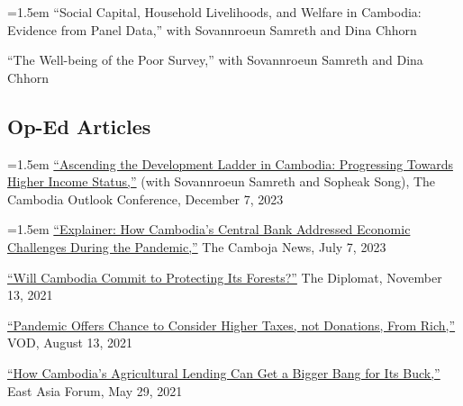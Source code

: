 \documentclass[10pt,a4paper]{article}
\begin{document}
	\hangindent=1.5em
	``Social Capital, Household Livelihoods, and Welfare in Cambodia: Evidence from Panel Data,'' with Sovannroeun Samreth and Dina Chhorn\\ \vspace{-.5em}
	
	``The Well-being of the Poor Survey,'' with Sovannroeun Samreth and Dina Chhorn

\subsection*{Op-Ed Articles}

	\hangindent=1.5em
	\href{https://coc2023.cdri.org.kh/ascending-the-development-ladder-in-cambodia-progressing-towards-higher-income-status/}{``Ascending the Development Ladder in Cambodia: Progressing Towards Higher Income Status,''} (with Sovannroeun Samreth and Sopheak Song), The Cambodia Outlook Conference, December 7, 2023\\ \vspace{-.5em}
	
	\hangindent=1.5em
	\href{https://cambojanews.com/explainer-how-cambodias-central-bank-addressed-economic-challenges-during-the-pandemic/}{``Explainer: How Cambodia's Central Bank Addressed Economic Challenges During the Pandemic,''} The Camboja News, July 7, 2023\\ \vspace{-.5em}
	
	\href{https://thediplomat.com/2021/11/will-cambodia-commit-to-protecting-its-forests/}{``Will Cambodia Commit to Protecting Its Forests?''} The Diplomat, November 13, 2021\\ \vspace{-.5em}

	\href{https://vodenglish.news/opinion-pandemic-offers-chance-to-consider-higher-taxes-not-donations-from-rich/}{``Pandemic Offers Chance to Consider Higher Taxes, not Donations, From Rich,''} VOD, August 13, 2021\\ \vspace{-.5em}

	\href{https://www.eastasiaforum.org/2021/05/29/how-cambodias-agricultural-lending-can-get-a-bigger-bang-for-its-buck/}{``How Cambodia's Agricultural Lending Can Get a Bigger Bang for Its Buck,''} East Asia Forum, May 29, 2021\\ \vspace{-.5em}
\end{document}
